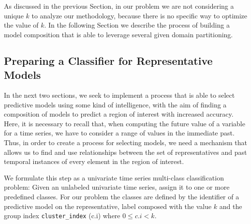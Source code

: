 As discussed in the previous Section, in our problem we are not considering a unique $k$ to analyze our methodology, because there is no specific way to optimize the value of $k$. In the following Section we describe the process of building a model composition that is able to leverage several given domain partitioning.

\subsection{Preparing a Classifier for Representative Models}
\label{Sec:Classifier}
In the next two sections, we seek to implement a process that is able to select predictive models using some kind of intelligence, with the aim of finding a composition of models to predict a region of interest with increased accuracy. Here, it is  necessary to recall that, when computing the future value of a variable for a time series, we have to consider a range of values in the immediate past. Thus, in order to create a process for selecting models, we need a mechanism that allows us to find and use relationships between the set of representatives and past temporal instances of every element in the region of interest. 

We formulate this step as a univariate time series multi-class classification problem: Given an unlabeled univariate time series, assign it to one or more predefined classes. For our problem the classes are defined by the identifier of a predictive model on the representative, label composed with the value $k$ and the group index \texttt{cluster\_index} (c.i) where $0 \leq c.i <k$. 



